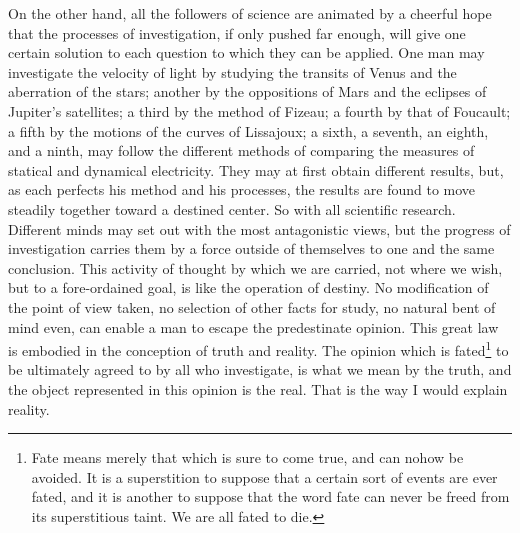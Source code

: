 \documentclass[]{article}
\newcounter{authornote}[page]
\newcommand{\authornote}[1]{\renewcommand{\thefootnote}{\fnsymbol{footnote}}\stepcounter{authornote}\footnote[\value{authornote}]{#1}\renewcommand{\thefootnote}{\arabic{footnote}}}
\begin{document}
On the other hand, all the followers of science are animated by a cheerful hope that the processes of investigation, if only pushed far enough, will give one certain solution to each question to which they can be applied. One man may investigate the velocity of light by studying the
transits of Venus and the aberration of the stars; another by the oppositions of Mars and the eclipses of Jupiter's satellites; a third by the method of Fizeau; a fourth by that of Foucault; a fifth by the motions of the curves of
Lissajoux; a sixth, a seventh, an eighth, and a ninth, may follow the different methods of comparing the measures of statical and dynamical electricity. They may at first obtain different results, but, as each perfects his method and his processes, the results are found to move steadily together toward a destined center. So with all scientific research. Different minds may set out with the most antagonistic views, but the progress of investigation carries them by a force outside of themselves to one and the same conclusion. This activity of thought by which we are carried, not where we wish, but to a fore-ordained goal, is like the operation of destiny. No modification of the
point of view taken, no selection of other facts for study, no natural bent of mind even, can enable a man to escape the predestinate opinion. This great law is embodied in the conception of truth and reality. The opinion which is fated\authornote{Fate means merely that which is sure to come true, and can nohow be avoided. It is a superstition to suppose that a certain sort of events are ever fated, and it is another to suppose that the word fate can never be freed from its superstitious taint. We are all fated to die.} to be ultimately agreed to by all who investigate, is what we mean by the truth, and the object represented in this opinion is the real. That is the way I would explain reality.
\end{document}
